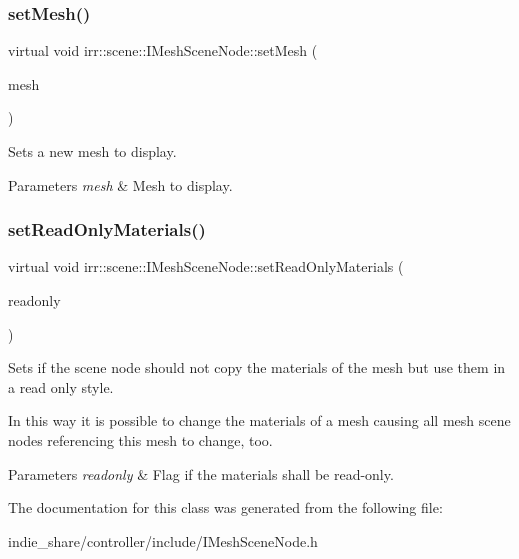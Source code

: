 \subsubsection{\texorpdfstring{set\+Mesh()}{setMesh()}}
{\footnotesize\ttfamily virtual void irr\+::scene\+::\+I\+Mesh\+Scene\+Node\+::set\+Mesh (\begin{DoxyParamCaption}\item[{\hyperlink{classirr_1_1scene_1_1IMesh}{I\+Mesh} $\ast$}]{mesh }\end{DoxyParamCaption})\hspace{0.3cm}{\ttfamily [pure virtual]}}



Sets a new mesh to display. 


\begin{DoxyParams}{Parameters}
{\em mesh} & Mesh to display. \\
\hline
\end{DoxyParams}
\mbox{\label{classirr_1_1scene_1_1IMeshSceneNode_a3bae73b4f7b1a6b265a62ece964c008f}} 
\subsubsection{\texorpdfstring{set\+Read\+Only\+Materials()}{setReadOnlyMaterials()}}
{\footnotesize\ttfamily virtual void irr\+::scene\+::\+I\+Mesh\+Scene\+Node\+::set\+Read\+Only\+Materials (\begin{DoxyParamCaption}\item[{bool}]{readonly }\end{DoxyParamCaption})\hspace{0.3cm}{\ttfamily [pure virtual]}}



Sets if the scene node should not copy the materials of the mesh but use them in a read only style. 

In this way it is possible to change the materials of a mesh causing all mesh scene nodes referencing this mesh to change, too. 
\begin{DoxyParams}{Parameters}
{\em readonly} & Flag if the materials shall be read-\/only. \\
\hline
\end{DoxyParams}


The documentation for this class was generated from the following file\+:\begin{DoxyCompactItemize}
\item 
indie\+\_\+share/controller/include/I\+Mesh\+Scene\+Node.\+h\end{DoxyCompactItemize}
